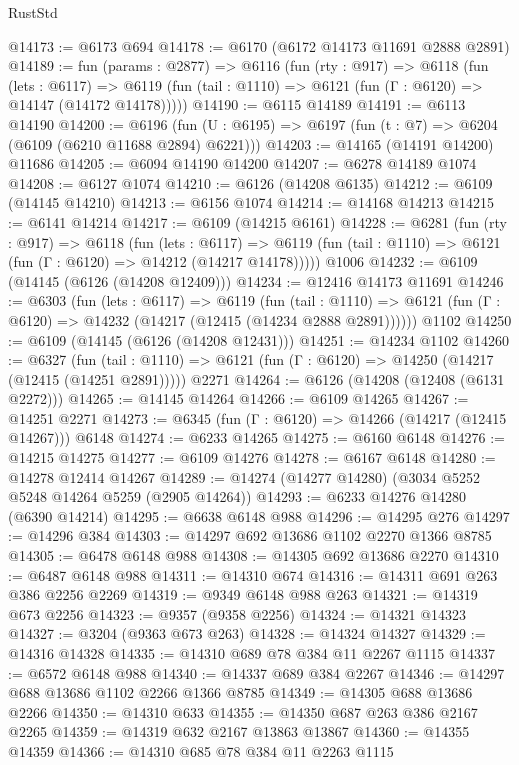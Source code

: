 \begin{lexlean}{RustStd}
\begin{coremodule}
@14173 := @6173 @694
@14178 := @6170 (@6172 @14173 @11691 @2888 @2891)
@14189 := fun (params : @2877) =>
  @6116
    (fun (rty : @917) =>
    @6118
      (fun (lets : @6117) =>
      @6119 (fun (tail : @1110) => @6121 (fun (Γ : @6120) => @14147 (@14172 @14178)))))
@14190 := @6115 @14189
@14191 := @6113 @14190
@14200 := @6196
    (fun (U : @6195) => @6197 (fun (t : @7) => @6204 (@6109 (@6210 @11688 @2894) @6221)))
@14203 := @14165 (@14191 @14200) @11686
@14205 := @6094 @14190 @14200
@14207 := @6278 @14189 @1074
@14208 := @6127 @1074
@14210 := @6126 (@14208 @6135)
@14212 := @6109 (@14145 @14210)
@14213 := @6156 @1074
@14214 := @14168 @14213
@14215 := @6141 @14214
@14217 := @6109 (@14215 @6161)
@14228 := @6281
    (fun (rty : @917) =>
    @6118
      (fun (lets : @6117) =>
      @6119 (fun (tail : @1110) => @6121 (fun (Γ : @6120) => @14212 (@14217 @14178)))))
    @1006
@14232 := @6109 (@14145 (@6126 (@14208 @12409)))
@14234 := @12416 @14173 @11691
@14246 := @6303
    (fun (lets : @6117) =>
    @6119
      (fun (tail : @1110) =>
      @6121 (fun (Γ : @6120) => @14232 (@14217 (@12415 (@14234 @2888 @2891))))))
    @1102
@14250 := @6109 (@14145 (@6126 (@14208 @12431)))
@14251 := @14234 @1102
@14260 := @6327
    (fun (tail : @1110) => @6121 (fun (Γ : @6120) => @14250 (@14217 (@12415 (@14251 @2891)))))
    @2271
@14264 := @6126 (@14208 (@12408 (@6131 @2272)))
@14265 := @14145 @14264
@14266 := @6109 @14265
@14267 := @14251 @2271
@14273 := @6345 (fun (Γ : @6120) => @14266 (@14217 (@12415 @14267))) @6148
@14274 := @6233 @14265
@14275 := @6160 @6148
@14276 := @14215 @14275
@14277 := @6109 @14276
@14278 := @6167 @6148
@14280 := @14278 @12414 @14267
@14289 := @14274 (@14277 @14280) (@3034 @5252 @5248 @14264 @5259 (@2905 @14264))
@14293 := @6233 @14276 @14280 (@6390 @14214)
@14295 := @6638 @6148 @988
@14296 := @14295 @276
@14297 := @14296 @384
@14303 := @14297 @692 @13686 @1102 @2270 @1366 @8785
@14305 := @6478 @6148 @988
@14308 := @14305 @692 @13686 @2270
@14310 := @6487 @6148 @988
@14311 := @14310 @674
@14316 := @14311 @691 @263 @386 @2256 @2269
@14319 := @9349 @6148 @988 @263
@14321 := @14319 @673 @2256
@14323 := @9357 (@9358 @2256)
@14324 := @14321 @14323
@14327 := @3204 (@9363 @673 @263)
@14328 := @14324 @14327
@14329 := @14316 @14328
@14335 := @14310 @689 @78 @384 @11 @2267 @1115
@14337 := @6572 @6148 @988
@14340 := @14337 @689 @384 @2267
@14346 := @14297 @688 @13686 @1102 @2266 @1366 @8785
@14349 := @14305 @688 @13686 @2266
@14350 := @14310 @633
@14355 := @14350 @687 @263 @386 @2167 @2265
@14359 := @14319 @632 @2167 @13863 @13867
@14360 := @14355 @14359
@14366 := @14310 @685 @78 @384 @11 @2263 @1115

\end{coremodule}
\end{lexlean}
